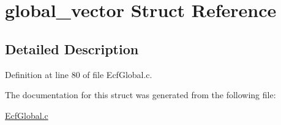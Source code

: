 \hypertarget{structglobal__vector}{\section{global\-\_\-vector Struct Reference}
\label{structglobal__vector}
}


\subsection{Detailed Description}


Definition at line 80 of file Ecf\-Global.\-c.



The documentation for this struct was generated from the following file\-:\begin{DoxyCompactItemize}
\item 
\hyperlink{_ecf_global_8c}{Ecf\-Global.\-c}\end{DoxyCompactItemize}
